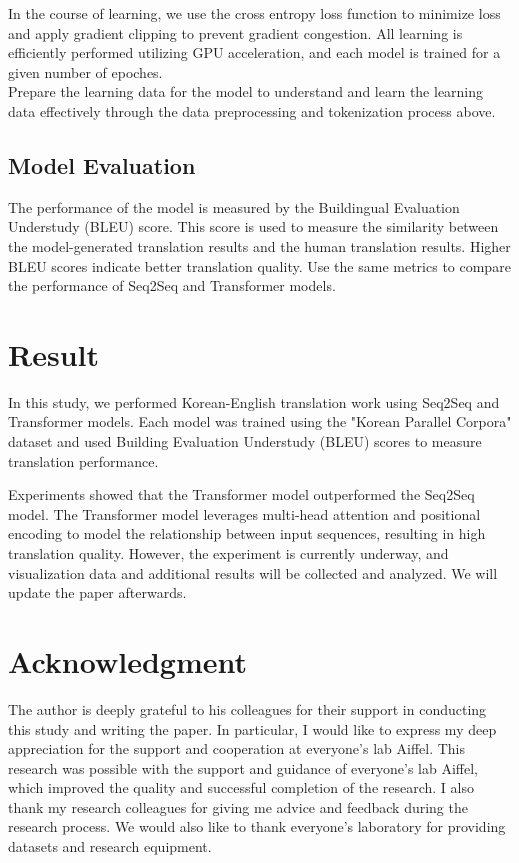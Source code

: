 \documentclass{article}
\begin{document}
In the course of learning, we use the cross entropy loss function to minimize loss and apply gradient clipping to prevent gradient congestion. All learning is efficiently performed utilizing GPU acceleration, and each model is trained for a given number of epoches.\\

Prepare the learning data for the model to understand and learn the learning data effectively through the data preprocessing and tokenization process above.


\subsection{Model Evaluation}
The performance of the model is measured by the Buildingual Evaluation Understudy (BLEU) score. This score is used to measure the similarity between the model-generated translation results and the human translation results. Higher BLEU scores indicate better translation quality. Use the same metrics to compare the performance of Seq2Seq and Transformer models.


\section{Result}
In this study, we performed Korean-English translation work using Seq2Seq and Transformer models. Each model was trained using the "Korean Parallel Corpora" dataset and used Building Evaluation Understudy (BLEU) scores to measure translation performance.

Experiments showed that the Transformer model outperformed the Seq2Seq model. The Transformer model leverages multi-head attention and positional encoding to model the relationship between input sequences, resulting in high translation quality. However, the experiment is currently underway, and visualization data and additional results will be collected and analyzed. We will update the paper afterwards.


\section{Acknowledgment}
The author is deeply grateful to his colleagues for their support in conducting this study and writing the paper. In particular, I would like to express my deep appreciation for the support and cooperation at everyone's lab Aiffel. This research was possible with the support and guidance of everyone's lab Aiffel, which improved the quality and successful completion of the research. I also thank my research colleagues for giving me advice and feedback during the research process. We would also like to thank everyone's laboratory for providing datasets and research equipment.
\end{document}
